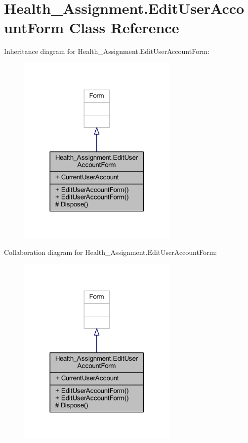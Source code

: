 \hypertarget{class_health___assignment_1_1_edit_user_account_form}{}\section{Health\+\_\+\+Assignment.\+Edit\+User\+Account\+Form Class Reference}
\label{class_health___assignment_1_1_edit_user_account_form}


Inheritance diagram for Health\+\_\+\+Assignment.\+Edit\+User\+Account\+Form\+:\nopagebreak
\begin{figure}[H]
\begin{center}
\leavevmode
\includegraphics[width=222pt]{class_health___assignment_1_1_edit_user_account_form__inherit__graph}
\end{center}
\end{figure}


Collaboration diagram for Health\+\_\+\+Assignment.\+Edit\+User\+Account\+Form\+:\nopagebreak
\begin{figure}[H]
\begin{center}
\leavevmode
\includegraphics[width=222pt]{class_health___assignment_1_1_edit_user_account_form__coll__graph}
\end{center}
\end{figure}
